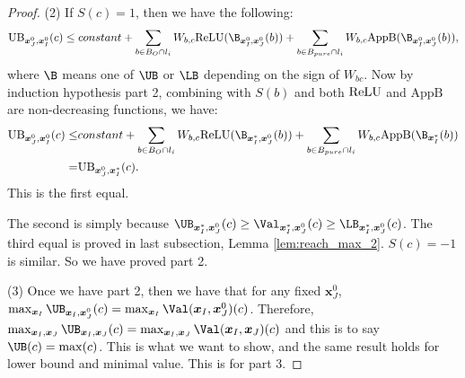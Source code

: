 \begin{proof}
					(2) If $S(c)=1$, then we have the following:	\begin{align*}
						\mathrm{UB}_{\boldsymbol{x}^0_J,\boldsymbol{x}^0_I}(c) \leq constant + \sum_{b\in B_O\cap l_i} W_{b,c}\ReLU(\B_{\boldsymbol{x}^0_I,\boldsymbol{x}^0_J}(b)) + \sum_{b\in B_{pure}\cap l_{i}} W_{b,c} \mathrm{AppB}(\B_{\boldsymbol{x}^0_I,\boldsymbol{x}^0_J}(b)),
					\end{align*}where $\B$ means one of $\UB$ or $\LB$ depending on the sign of $W_{bc}$. Now by induction hypothesis part 2, combining with $S(b)$ and both $\mathrm{ReLU}$ and $\mathrm{AppB}$ are non-decreasing functions, we have:\begin{align*}
						\mathrm{UB}_{\boldsymbol{x}^0_J,\boldsymbol{x}^0_I}(c)\leq 
						&constant + \sum_{b\in B_O\cap l_i} W_{b,c}\ReLU(\B_{\boldsymbol{x}^*_I,\boldsymbol{x}^0_J}(b)) + \sum_{b\in B_{pure}\cap l_{i}} W_{b,c} \mathrm{AppB}(\B_{\boldsymbol{x}^*_I}(b))\\
						= & \mathrm{UB}_{\boldsymbol{x}^0_J,\boldsymbol{x}^*_I}(c). 
					\end{align*}  This is the first equal.
					
					The second is simply because $\UB_{\boldsymbol{x}^*_I,\boldsymbol{x}^0_J}(c)\geq \Val_{\boldsymbol{x}^*_I,\boldsymbol{x}^0_J}(c)\geq\LB_{\boldsymbol{x}^*_I,\boldsymbol{x}^0_J}(c)$.	The third equal is proved in last subsection, Lemma \ref{lem:reach_max_2}. $S(c)=-1$ is similar. So we have proved part 2.
					
					(3) Once we have part 2, then we have that for any fixed $\boldsymbol{x}^0_J$, $\max_{\boldsymbol{x}_I} \UB_{\boldsymbol{x}_I,\boldsymbol{x}^0_J}(c)= \max_{\boldsymbol{x}_I} \Val(\boldsymbol{x}_I,\boldsymbol{x}^0_J)(c)$. Therefore, $\max_{\boldsymbol{x}_I,\boldsymbol{x}_J} \UB_{\boldsymbol{x}_I,\boldsymbol{x}_J}(c)= \max_{\boldsymbol{x}_I,\boldsymbol{x}_J} \Val(\boldsymbol{x}_I,\boldsymbol{x}_J)(c)$ and this is to say $\UB(c)=\max(c)$. This is what we want to show, and the same result holds for lower bound and minimal value. This is for part 3.
					
					
					
					
				\end{proof}
				
				
				
				
